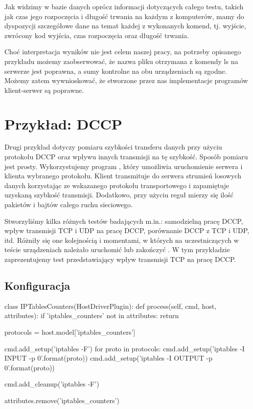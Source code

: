 \documentclass[00-praca-magisterska.tex]{subfiles}
\begin{document}
Jak widzimy w bazie danych oprócz informacji dotyczących całego testu, takich
jak czas jego rozpoczęcia i długość trwania na każdym z komputerów, mamy do
dyspozycji szczegółowe dane na temat każdej z wykonanych komend, tj. wyjście,
zwrócony kod wyjścia, czas rozpoczęcia oraz długość trwania.

Choć interpretacja wyników nie jest celem naszej pracy, na potrzeby opisanego
przykładu możemy zaobserwować, że nazwa pliku otrzymana z komendy ls na serwerze
jest poprawna, a sumy kontrolne na obu urządzeniach są zgodne. Możemy zatem
wywnioskować, że stworzone przez nas implementacje programów klient-serwer są
poprawne.

\section{Przykład: DCCP}

Drugi przykład dotyczy pomiaru szybkości transferu danych przy użyciu protokołu
DCCP oraz wpływu innych transmisji na tę szybkość. Sposób pomiaru jest prosty.
Wykorzystujemy program , który umożliwia uruchomienie serwera i
klienta wybranego protokołu. Klient transmituje do serwera strumień losowych
danych korzystając ze wskazanego protokołu transportowego i zapamiętuje uzyskaną
szybkość transmisji. Dodatkowo, przy użyciu reguł  mierzy się
ilość pakietów i bajtów całego ruchu sieciowego.

Stworzyliśmy kilka różnych testów badających m.in.: samodzielną pracę DCCP,
wpływ transmisji TCP i UDP na pracę DCCP, porównanie DCCP z TCP i UDP, itd.
Różniły się one kolejnością i momentami, w których na uczestniczących w teście
urządzeniach należało uruchomić lub zakończyć . W tym przykładzie
zaprezentujemy test przedstawiający wpływ transmisji TCP na pracę DCCP. 

\subsection{Konfiguracja}

\begin{pythoncode}
  class IPTablesCounters(HostDriverPlugin):
      def process(self, cmd, host, attributes):
          if 'iptables_counters' not in attributes:
              return 

          protocols = host.model['iptables_counters']

          cmd.add_setup('iptables -F')
          for proto in protocols:
              cmd.add_setup('iptables -I INPUT -p {0}'.format(proto))
              cmd.add_setup('iptables -I OUTPUT -p {0}'.format(proto))

          cmd.add_cleanup('iptables -F')

          attributes.remove('iptables_counters')
\end{pythoncode}
\end{document}
